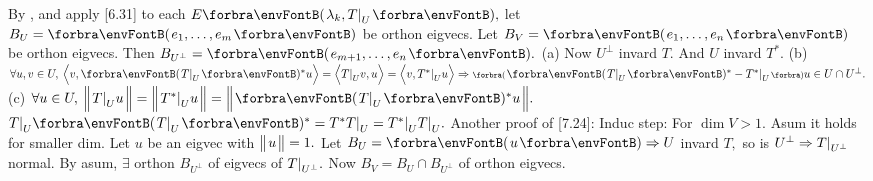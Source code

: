 By , and apply [6.31] to each $E\Par{\lambda_k,T\mmid_U},$ let $B_U=\Par{e_1,\dots,e_m}$ be orthon eigvecs.\parSol{}
Let $B_V=\Par{e_1,\dots,e_n}$ be orthon eigvecs. Then $B_{U^\perp}=\Par{e_{m+1},\dots,e_n}.$\parSol{}
(a) Now $U^\perp$ invard $T.$ \;And $U$ invard $T^*.$\parSol{}
(b) $\forall u,v\in U,\:\BigAng{v,\Par{T\mmid_U}{^*}u}=\BigAng{T\mmid_U v,u}=\BigAng{v,T^*\mmid_U u}\Rightarrow\BigPar{\Par{T\mmid_U}{^*}-T^*\mmid_U}u\in U\cap U^\perp.$\vspace{2pt}\parSol{}
(c) $\forall u\in U,\:\BigDvert{T\mmid_U u}=\BigDvert{T^*\mmid_U u}=\BigDvert{\Par{T\mmid_U}{^*}u}.$ \;\Or $T\mmid_U\Par{T\mmid_U}{^*}=T^*T\mmid_U=T^*\mmid_UT\mmid_U.$\PfEnd\vspace{4pt}
\ANote Another proof of [7.24]: Induc step: For $\dim V>1.$ Asum it holds for smaller dim.\parNot
Let $u$ be an eigvec with $\big\Vert\hspace{1pt}{}u{}\hspace{1pt}\big\Vert=1.$ Let $B_U=\Par{u}\Rightarrow U$ invard $T,$ so is $U^\perp\Rightarrow T\text{\normalsize|}_{U^\perp}$ normal.\parNot
By asum, $\exists$ orthon $B_{U^\perp}$ of eigvecs of $T\text{\normalsize|}_{U^\perp}.$ Now $B_V=B_U\cap B_{U^\perp}$ of orthon eigvecs.\PfEnd
\SepLine
\ChEnd

